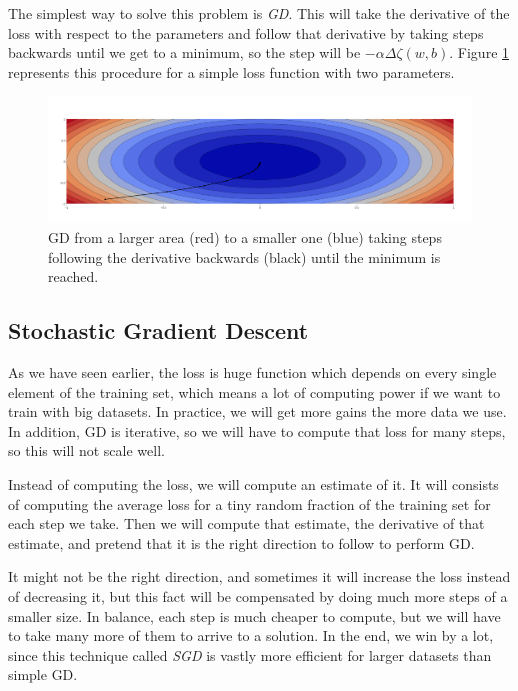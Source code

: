 \documentclass[english, 11pt]{article}
\begin{document}
	The simplest way to solve this problem is \emph{\ac{GD}}. This will take the derivative of the loss with respect to the parameters and follow that derivative by taking steps backwards until we get to a minimum, so the step will be $-\alpha\Delta\zeta(w, b)$. Figure \ref{fig:gradient-descent} represents this procedure for a simple loss function with two parameters.

	\begin{figure}[!hbt]
		\centering
		\includegraphics[width=\textwidth]{l1/figures/contour-scatter}
		\caption{\ac{GD} from a larger area (red) to a smaller one (blue) taking steps following the derivative backwards (black) until the minimum is reached.}
		\label{fig:gradient-descent}
	\end{figure}

	\subsection{Stochastic Gradient Descent}

	As we have seen earlier, the loss is huge function which depends on every single element of the training set, which means a lot of computing power if we want to train with big datasets. In practice, we will get more gains the more data we use. In addition, \ac{GD} is iterative, so we will have to compute that loss for many steps, so this will not scale well.

	Instead of computing the loss, we will compute an estimate of it. It will consists of computing the average loss for a tiny random fraction of the training set for each step we take. Then we will compute that estimate, the derivative of that estimate, and pretend that it is the right direction to follow to perform \ac{GD}.

	It might not be the right direction, and sometimes it will increase the loss instead of decreasing it, but this fact will be compensated by doing much more steps of a smaller size. In balance, each step is much cheaper to compute, but we will have to take many more of them to arrive to a solution. In the end, we win by a lot, since this technique called \emph{\ac{SGD}} is vastly more efficient for larger datasets than simple \ac{GD}.

  
\end{document}
